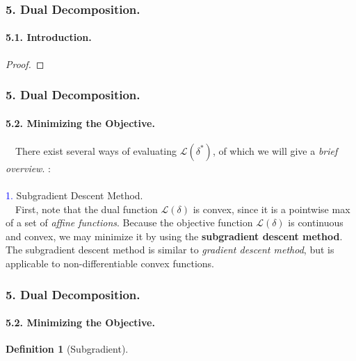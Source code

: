 \documentclass[11pt]{beamer}
\newtheorem*{pf of lemma}{\it Proof of the \normalfont \bf Lemma}
\newtheorem*{pf of claim}{\it Proof of the \normalfont \sf Claim}
\newtheorem{defi}{Definition}[section]
\begin{document}
\begin{frame}
\frametitle{5. Dual Decomposition.}
\framesubtitle{5.1. Introduction.}

\begin{proof} 
\end{proof}

\end{frame}

\begin{frame}
\frametitle{5. Dual Decomposition.}
\framesubtitle{5.2. Minimizing the Objective.}
\ \ \indent There exist several ways of evaluating $\mathcal{L} \left( \delta^* \right)$, of which we will give a \textit{brief overview}. : \\ \ \\
\textcolor{blue}{1.} Subgradient Descent Method.\\
\ \ \indent First, note that the dual function $\mathcal{L} \left( \delta \right)$ is convex, since it is a pointwise max of a set of \textit{affine functions}. Because the objective function $\mathcal{L} \left( \delta \right)$ is continuous and convex, we may minimize it by using the \textbf{subgradient descent method}. The subgradient descent method is similar to \textit{gradient descent method}, but is applicable to non-differentiable convex functions. 

\end{frame}

\begin{frame}
\frametitle{5. Dual Decomposition.}
\framesubtitle{5.2. Minimizing the Objective.}

\begin{defi} [Subgradient] 
\end{defi}

\end{frame}
\end{document}
